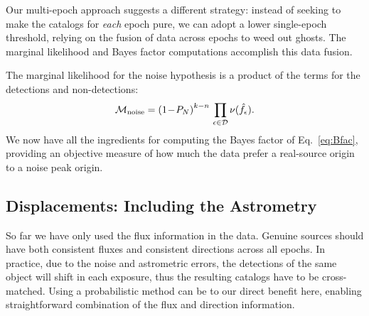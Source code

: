 \documentclass[twocolumn]{emulateapj}
\newcommand{\eind}{\epsilon}  %
\newcommand{\mlike}{\mathcal{M}}  %
\newcommand{\flux}{f}
\newcommand{\fest}{\hat{\flux}}  %
\newcommand{\dtxn}{\mathcal{D}}  %
\newcommand{\npd}{\nu}  %
\begin{document}

Our multi-epoch approach suggests a different strategy: instead of seeking to make the catalogs for \emph{each} epoch pure, we can adopt a lower single-epoch threshold, relying on the fusion of data across epochs to weed out ghosts.
The marginal likelihood and Bayes factor computations accomplish this data fusion.

The marginal likelihood for the noise hypothesis is a product of the terms for the detections and non-detections:
%
\begin{equation}
\mlike_{\rm noise} = \left(1\!-\!P_N\right)^{k-n}\,\prod_{\eind \in \dtxn} \npd(\fest_\eind).
\end{equation}
%
We now have all the ingredients for computing the Bayes factor of Eq.~\ref{eq:Bfac}, providing an objective measure of how much the data prefer a real-source origin to a noise peak origin. 


\subsection{Displacements: Including the Astrometry}
\label{sec:astrom}
\noindent
So far we have only used the flux information in the data. 
Genuine sources should have both consistent fluxes and consistent directions across all epochs.
In practice, due to the noise and astrometric errors, the detections of the same object will shift in each exposure, thus the resulting catalogs have to be cross-matched. 
Using a probabilistic method can be to our direct benefit here, enabling straightforward combination of the flux and direction information.
\end{document}
